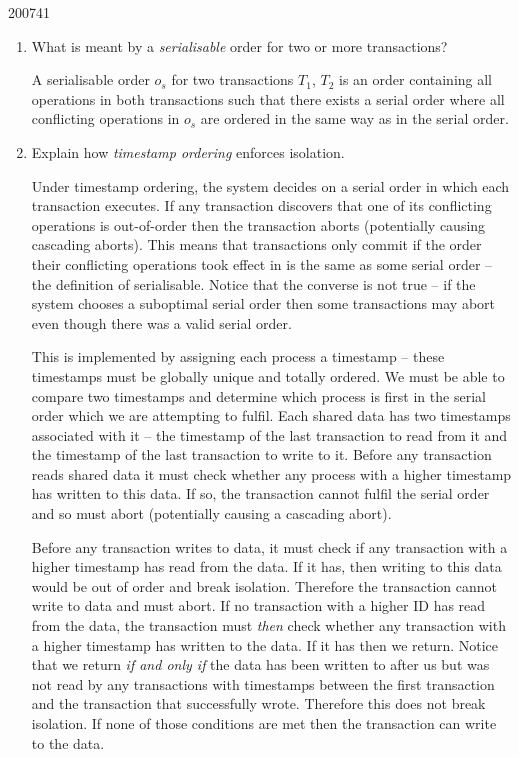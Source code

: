 \documentclass[10pt,\jkfside,a4paper]{article}
\begin{document}
\begin{examquestion}{2007}{4}{1}

\begin{enumerate}[label=(\alph*)]

\item What is meant by a \textit{serialisable} order for two or more
transactions?

A serialisable order $o_s$ for two transactions $T_1$, $T_2$ is an order
containing all operations in both transactions such that there exists a
serial order where all conflicting operations in $o_s$ are ordered in the same
way as in the serial order.

\item Explain how \textit{timestamp ordering} enforces isolation.

Under timestamp ordering, the system decides on a serial order in which each
transaction executes. If any transaction discovers that one of its
conflicting operations is out-of-order then the transaction aborts
(potentially causing cascading aborts). This means that transactions only
commit if the order their conflicting operations took effect in is the same
as some serial order -- the definition of serialisable. Notice that the
converse is not true -- if the system chooses a suboptimal serial order then
some transactions may abort even though there was a valid serial order.

This is implemented by assigning each process a timestamp -- these
timestamps must be globally unique and totally ordered. We must be able to
compare two timestamps and determine which process is first in the serial
order which we are attempting to fulfil. Each shared data has two timestamps
associated with it -- the timestamp of the last transaction to read from it
and the timestamp of the last transaction to write to it. Before any
transaction reads shared data it must check whether any process with a
higher timestamp has written to this data. If so, the transaction cannot
fulfil the serial order and so must abort (potentially causing a cascading
abort).

Before any transaction writes to data, it must check if any transaction with
a higher timestamp has read from the data. If it has, then writing to this
data would be out of order and break isolation. Therefore the transaction
cannot write to data and must abort. If no transaction with a higher ID has
read from the data, the transaction must \textit{then} check whether any
transaction with a higher timestamp has written to the data. If it has then
we return. Notice that we return \textit{if and only if} the data has
been written to after us but was not read by any transactions with timestamps
between the first transaction and the transaction that successfully wrote.
Therefore this does not break isolation. If none of those conditions are
met then the transaction can write to the data.


\end{enumerate}
\end{examquestion}
\end{document}
